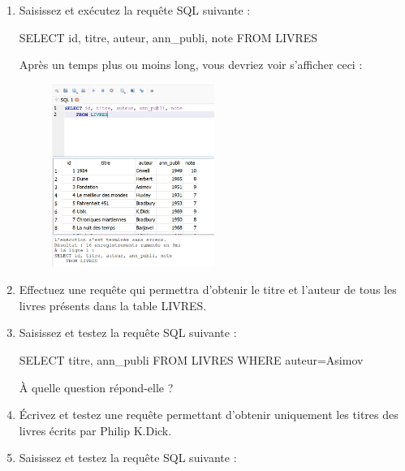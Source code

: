 \documentclass[
  letterpaper,
  DIV=11,
  numbers=noendperiod]{scrartcl}
\newenvironment{Shaded}{\begin{snugshade}}{\end{snugshade}}
\newcommand{\KeywordTok}[1]{\textcolor[rgb]{0.00,0.23,0.31}{#1}}
\newcommand{\NormalTok}[1]{\textcolor[rgb]{0.00,0.23,0.31}{#1}}
\newcommand{\OperatorTok}[1]{\textcolor[rgb]{0.37,0.37,0.37}{#1}}
\newcommand{\StringTok}[1]{\textcolor[rgb]{0.13,0.47,0.30}{#1}}
\begin{document}
\begin{enumerate}
\begin{figure}
{  }

  \end{figure}
\item
  Saisissez et exécutez la requête SQL suivante :

\begin{Shaded}
\begin{Highlighting}[]
\KeywordTok{SELECT} \KeywordTok{id}\NormalTok{, titre, auteur, ann\_publi, note}
\KeywordTok{FROM}\NormalTok{ LIVRES}
\end{Highlighting}
\end{Shaded}

  Après un temps plus ou moins long, vous devriez voir s'afficher ceci :

  \begin{figure}

  {\centering \includegraphics[width=0.5\textwidth,height=\textheight]{TP1_7.png}

  }

  \end{figure}
\item
  Effectuez une requête qui permettra d'obtenir le titre et l'auteur de
  tous les livres présents dans la table LIVRES.
\item
  Saisissez et testez la requête SQL suivante :

\begin{Shaded}
\begin{Highlighting}[]
\KeywordTok{SELECT}\NormalTok{ titre, ann\_publi}
\KeywordTok{FROM}\NormalTok{ LIVRES}
\KeywordTok{WHERE}\NormalTok{ auteur}\OperatorTok{=}\StringTok{\textquotesingle{}Asimov\textquotesingle{}}
\end{Highlighting}
\end{Shaded}

  À quelle question répond-elle ?
\item
  Écrivez et testez une requête permettant d'obtenir uniquement les
  titres des livres écrits par Philip K.Dick.
\item
  Saisissez et testez la requête SQL suivante :


\end{enumerate}
\end{document}
